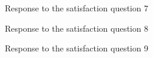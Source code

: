 \documentclass[12pt,oneside,openright,a4paper]{cpe-english-project}
\begin{document}
\begin{figure}[!h]\centering {} \caption{Response to the satisfaction question 7} \end{figure}
\begin{figure}[!h]\centering {} \caption{Response to the satisfaction question 8} \end{figure}
\begin{figure}[!h]\centering {} \caption{Response to the satisfaction question 9} \end{figure}
\end{document}
